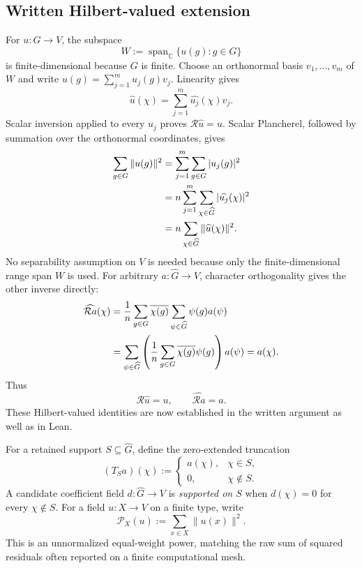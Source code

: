 \documentclass[11pt]{article}
\begin{document}
\subsection{Written Hilbert-valued extension}
For $u:G\to V$, the subspace
\[
  W:=\operatorname{span}_{\mathbb C}\{u(g):g\in G\}
\]
is finite-dimensional because $G$ is finite.  Choose an orthonormal basis $v_1,\ldots,v_m$ of
$W$ and write $u(g)=\sum_{j=1}^{m}u_j(g)v_j$.  Linearity gives
\begin{equation}
  \widehat u(\chi)=\sum_{j=1}^{m}\widehat{u_j}(\chi)v_j.
  \label{eq:coordinate-transform}
\end{equation}
Scalar inversion applied to every $u_j$ proves $\mathcal R\widehat u=u$.  Scalar Plancherel,
followed by summation over the orthonormal coordinates, gives
\begin{align}
  \sum_{g\in G}\|u(g)\|^2
  &=\sum_{j=1}^{m}\sum_{g\in G}|u_j(g)|^2 \notag\\
  &=n\sum_{j=1}^{m}\sum_{\chi\in\widehat G}|\widehat{u_j}(\chi)|^2 \notag\\
  &=n\sum_{\chi\in\widehat G}\|\widehat u(\chi)\|^2.
  \label{eq:vector-parseval}
\end{align}
No separability assumption on $V$ is needed because only the finite-dimensional range span $W$
is used.  For arbitrary $a:\widehat G\to V$, character orthogonality gives the other inverse
directly:
\begin{align}
  \widehat{\mathcal R a}(\chi)
  &=\frac1n\sum_{g\in G}\overline{\chi(g)}
      \sum_{\psi\in\widehat G}\psi(g)a(\psi) \notag\\
  &=\sum_{\psi\in\widehat G}
      \left(\frac1n\sum_{g\in G}\overline{\chi(g)}\psi(g)\right)a(\psi)
    =a(\chi).
  \label{eq:reconstruction-left-inverse}
\end{align}
Thus
\begin{equation}
  \mathcal R\widehat u=u,
  \qquad
  \widehat{\mathcal R a}=a.
  \label{eq:inverse-pair}
\end{equation}
These Hilbert-valued identities are now established in the written argument as well as in Lean.

For a retained support $S\subseteq\widehat G$, define the zero-extended truncation
\begin{equation}
  (T_Sa)(\chi):=
  \begin{cases}
    a(\chi),&\chi\in S,\\
    0,&\chi\notin S.
  \end{cases}
  \label{eq:truncation}
\end{equation}
A candidate coefficient field $d:\widehat G\to V$ is \emph{supported on $S$} when
$d(\chi)=0$ for every $\chi\notin S$.  For a field $u:X\to V$ on a finite type, write
\begin{equation}
  \mathcal P_X(u):=\sum_{x\in X}\|u(x)\|^2.
  \label{eq:power}
\end{equation}
This is an unnormalized equal-weight power, matching the raw sum of squared residuals often
reported on a finite computational mesh.
\end{document}
